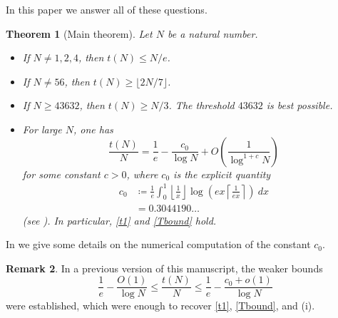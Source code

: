 \documentclass[12pt,a4paper,reqno]{amsart}
\numberwithin{equation}{section}
\theoremstyle{plain}
\newtheorem{theorem}{Theorem}[section]
\theoremstyle{definition}
\newtheorem{remark}[theorem]{Remark}
\begin{document}
In this paper we answer all of these questions.

\begin{theorem}[Main theorem]\label{main} Let $N$ be a natural number.
\begin{itemize}
\item[(i)] If $N \neq 1,2,4$, then $t(N) \leq N/e$.
\item[(ii)]  If $N \neq 56$, then $t(N) \geq \lfloor 2N/7 \rfloor$.
\item[(iii)]  If $N \geq 43632$, then $t(N) \geq N/3$.  The threshold $43632$ is best possible.
\item[(iv)]  For large $N$, one has
  \begin{equation}\label{asym}
    \frac{t(N)}{N} = \frac{1}{e} - \frac{c_0}{\log N} + O\left( \frac{1}{\log^{1+c} N} \right)
  \end{equation}
for some constant $c>0$, where $c_0$ is the explicit quantity
\begin{equation}\label{cdef}
  \begin{split}
  c_0 &\coloneqq \frac{1}{e} \int_0^1 \left \lfloor \frac{1}{x} \right\rfloor \log \left( ex \left \lceil \frac{1}{ex} \right\rceil \right)\ dx \\
  &= 0.3044190\dots
\end{split}
\end{equation}
(see ).  In particular, \eqref{t1} and \eqref{Tbound} hold.
\end{itemize}
\end{theorem}

In  we give some details on the numerical computation of the constant $c_0$.

\begin{remark} In a previous version \cite{tao} of this manuscript, the weaker bounds
  $$ \frac{1}{e} - \frac{O(1)}{\log N} \leq \frac{t(N)}{N} \leq \frac{1}{e} - \frac{c_0+o(1)}{\log N}$$
were established, which were enough to recover \eqref{t1}, \eqref{Tbound}, and (i). 
\end{remark}  
\end{document}
